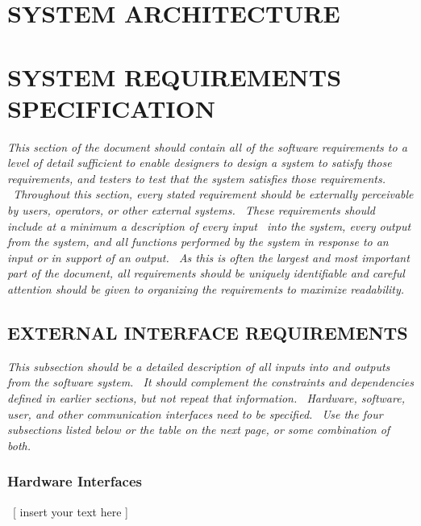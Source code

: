 \documentclass[twoside,letterpaper]{article}
\begin{document}
\clearpage\section[SYSTEM ARCHITECTURE]{\rmfamily\bfseries\color{black}
SYSTEM ARCHITECTURE}
\clearpage\section[SYSTEM REQUIREMENTS SPECIFICATION]{\rmfamily\bfseries\color{black}
SYSTEM REQUIREMENTS SPECIFICATION}
{\itshape\color{black}
This section of the document should contain all of the software
requirements to a level of detail sufficient to enable designers to
design a system to satisfy those requirements, and testers to test that
the system satisfies those requirements. \ Throughout this section,
every stated requirement should be externally perceivable by users,
operators, or other external systems. \ These requirements should
include at a minimum a description of every input \ into the system,
every output from the system, and all functions performed by the system
in response to an input or in support of an output. \ As this is often
the largest and most important part of the document, all requirements
should be uniquely identifiable and careful attention should be given
to organizing the requirements to maximize readability.}

\subsection[EXTERNAL INTERFACE
REQUIREMENTS]{\rmfamily\bfseries\color{black}
EXTERNAL INTERFACE REQUIREMENTS}
{\itshape\color{black}
This subsection should be a detailed description of all inputs into and
outputs from the software system. \ It should complement the
constraints and dependencies defined in earlier sections, but not
repeat that information. \ Hardware, software, user, and other
communication interfaces need to be specified. \ Use the four
subsections listed below or the table on the next page, or some
combination of both.}

\subsubsection[Hardware
Interfaces]{\rmfamily\bfseries\color{black}
Hardware Interfaces}
{\color{black}
\foreignlanguage{english}{\ }\foreignlanguage{english}{[ insert your
text here ]}}
\end{document}
